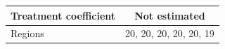 \begingroup
\centering
\begin{tabular}{lc}
\toprule
Treatment coefficient & Not estimated\\
\midrule
Regions & 20, 20, 20, 20, 20, 19\\
\bottomrule
\end{tabular}
\par\endgroup
